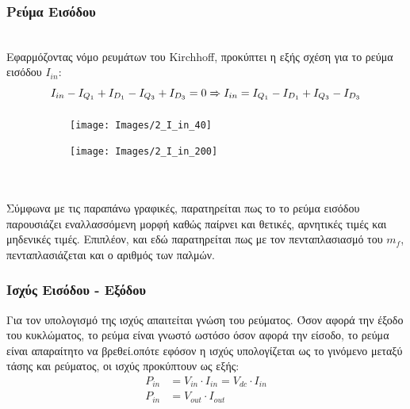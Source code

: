 \subsubsection*{Ρεύμα Εισόδου}
\noindent\\
Εφαρμόζοντας νόμο ρευμάτων του Kirchhoff, προκύπτει η εξής σχέση για το ρεύμα εισόδου $I_{in}$:
\begin{equation}
	I_{in} - I_{Q_1} + I_{D_1} - I_{Q_3} + I_{D_3} = 0 \xRightarrow{} I_{in} = I_{Q_1} - I_{D_1} + I_{Q_3} - I_{D_3} 	\label{sxesh}
\end{equation}
\begin{figure}[h!]
	\begin{subfigure}{0.49\textwidth}
		\centering
		\texttt{[image: Images/2\_I\_in\_40]}
	\end{subfigure}
	\begin{subfigure}{0.49\textwidth}
		\centering
		\texttt{[image: Images/2\_I\_in\_200]}
	\end{subfigure}
\end{figure}\\
\noindent\\
Σύμφωνα με τις παραπάνω γραφικές, παρατηρείται πως το το ρεύμα εισόδου παρουσιάζει εναλλασσόμενη μορφή καθώς παίρνει και θετικές, αρνητικές τιμές και μηδενικές τιμές. Επιπλέον, και εδώ παρατηρείται πως με τον πενταπλασιασμό του $m_f$, πενταπλασιάζεται και ο αριθμός των παλμών.


\clearpage
\subsubsection*{Ισχύς Εισόδου - Εξόδου}
Για τον υπολογισμό της ισχύς απαιτείται γνώση του ρεύματος. Όσον αφορά την έξοδο του κυκλώματος, το ρεύμα είναι γνωστό ωστόσο όσον αφορά την είσοδο, το ρεύμα είναι απαραίτητο να βρεθεί.οπότε εφόσον η ισχύς υπολογίζεται ως το γινόμενο μεταξύ τάσης και ρεύματος, οι ισχύς προκύπτουν ως εξής:
\begin{align*}
	P_{in} &= V_{in} \cdot I_{in} = V_{dc} \cdot I_{in}\\
	P_{in} &= V_{out} \cdot I_{out}
\end{align*}

